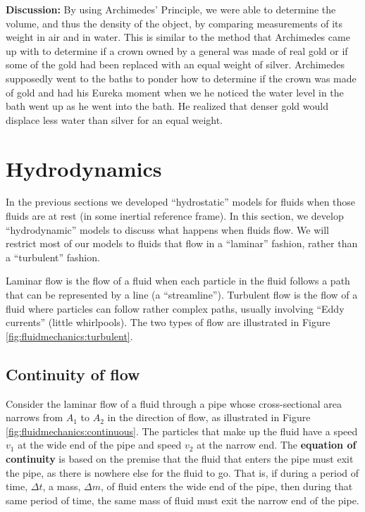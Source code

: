 {{\begin{example}
\textbf{Discussion:} By using Archimedes' Principle, we were able to determine the volume, and thus the density of the object, by comparing measurements of its weight in air and in water. This is similar to the method that Archimedes came up with to determine if a crown owned by a general was made of real gold or if some of the gold had been replaced with an equal weight of silver. Archimedes supposedly went to the baths to ponder how to determine if the crown was made of gold and had his Eureka moment when we he noticed the water level in the bath went up as he went into the bath. He realized that denser gold would displace less water than silver for an equal weight. 
\end{example}

\section{Hydrodynamics}
In the previous sections we developed ``hydrostatic'' models for fluids when those fluids are at rest (in some inertial reference frame). In this section, we develop ``hydrodynamic'' models to discuss what happens when fluids flow. We will restrict most of our models to fluids that flow in a ``laminar'' fashion, rather than a ``turbulent'' fashion.

Laminar flow is the flow of a fluid when each particle in the fluid follows a path that can be represented by a line (a ``streamline''). Turbulent flow is the flow of a fluid where particles can follow rather complex paths, usually involving ``Eddy currents'' (little whirlpools). The two types of flow are illustrated in Figure \ref{fig:fluidmechanics:turbulent}.

\subsection{Continuity of flow}
Consider the laminar flow of a fluid through a pipe whose cross-sectional area narrows from $A_1$ to $A_2$ in the direction of flow, as illustrated in Figure \ref{fig:fluidmechanics:continuous}.
The particles that make up the fluid have a speed $v_1$ at the wide end of the pipe and speed $v_2$ at the narrow end. The \textbf{equation of continuity} is based on the premise that the fluid that enters the pipe must exit the pipe, as there is nowhere else for the fluid to go. That is, if during a period of time, $\Delta t$, a mass, $\Delta m$, of fluid enters the wide end of the pipe, then during that same period of time, the same mass of fluid must exit the narrow end of the pipe. 

}}
